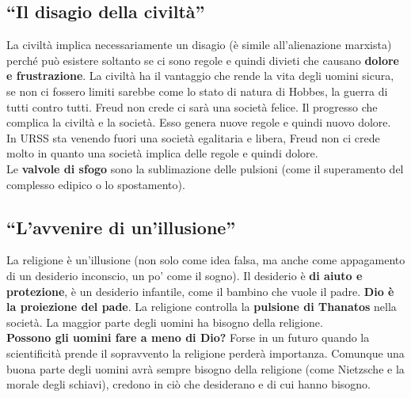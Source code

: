 \subsection{``Il disagio della civiltà''}
La civiltà implica necessariamente un disagio (è simile all'alienazione marxista) perché può esistere
soltanto se ci sono regole e quindi divieti che causano \textbf{dolore e frustrazione}. La civiltà
ha il vantaggio che rende la vita degli uomini sicura, se non ci fossero limiti sarebbe come lo stato
di natura di Hobbes, la guerra di tutti contro tutti. Freud non crede ci sarà una società felice. Il 
progresso che complica la civiltà e la società. Esso genera nuove regole e quindi nuovo dolore.\\
In URSS sta venendo fuori una società egalitaria e libera, Freud non ci crede molto in quanto una
società implica delle regole e quindi dolore.\\
Le \textbf{valvole di sfogo} sono la sublimazione delle pulsioni (come il superamento del complesso
edipico o lo spostamento).

\subsection{``L'avvenire di un'illusione''}
La religione è un'illusione (non solo come idea falsa, ma anche come appagamento di un desiderio 
inconscio, un po' come il sogno). Il desiderio è \textbf{di aiuto e protezione}, è un desiderio
infantile, come il bambino che vuole il padre. \textbf{Dio è la proiezione del pade}. La religione
controlla la \textbf{pulsione di Thanatos} nella società. La maggior parte degli uomini ha bisogno
della religione.\\
\textbf{Possono gli uomini fare a meno di Dio?} Forse in un futuro quando la scientificità prende il
sopravvento la religione perderà importanza. Comunque una buona parte degli uomini avrà sempre 
bisogno della religione (come Nietzsche e la morale degli schiavi), credono in ciò che desiderano e 
di cui hanno bisogno.
